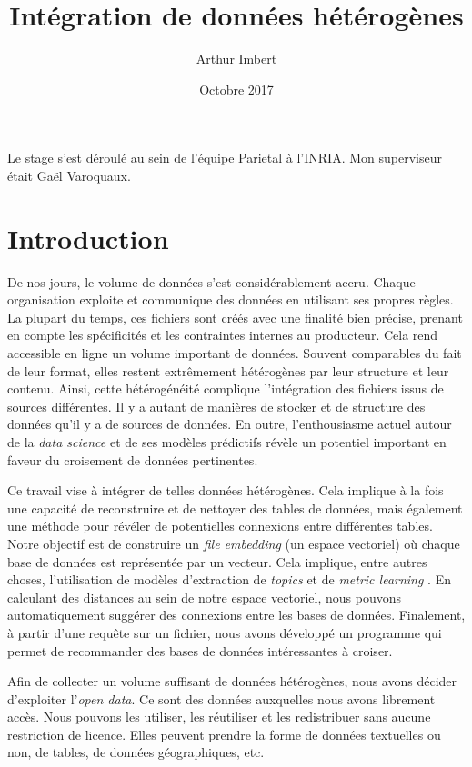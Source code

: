 \documentclass[a4paper]{article}
\author{Arthur Imbert}
\title{Intégration de données hétérogènes}
\date{Octobre 2017}
\begin{document}
	
	\maketitle
	
	Le stage s'est déroulé au sein de l'équipe \href{https://team.inria.fr/parietal/}{Parietal} à l'INRIA. Mon superviseur était Gaël Varoquaux.
	
	\section{Introduction}
	
	De nos jours, le volume de données s'est considérablement accru. Chaque organisation exploite et communique des données en utilisant ses propres règles. La plupart du temps, ces fichiers sont créés avec une finalité bien précise, prenant en compte les spécificités et les contraintes internes au producteur. Cela rend accessible en ligne un volume important de données. Souvent comparables du fait de leur format, elles restent extrêmement hétérogènes par leur structure et leur contenu. Ainsi, cette hétérogénéité complique l'intégration des fichiers issus de sources différentes. Il y a autant de manières de stocker et de structure des données qu'il y a de sources de données. En outre, l'enthousiasme actuel autour de la \emph{data science} et de ses modèles prédictifs révèle un potentiel important en faveur du croisement de données pertinentes. 
	
	Ce travail vise à intégrer de telles données hétérogènes. Cela implique à la fois une capacité de reconstruire et de nettoyer des tables de données, mais également une méthode pour révéler de potentielles connexions entre différentes tables. Notre objectif est de construire un \emph{file embedding} (un espace vectoriel) où chaque base de données est représentée par un vecteur. Cela implique, entre autres choses, l'utilisation de modèles d'extraction de \emph{topics} \cite{ref2} et de \emph{metric learning} \cite{ref3}. En calculant des distances au sein de notre espace vectoriel, nous pouvons automatiquement suggérer des connexions entre les bases de données. Finalement, à partir d'une requête sur un fichier, nous avons développé un programme qui permet de recommander des bases de données intéressantes à croiser.
	
	Afin de collecter un volume suffisant de données hétérogènes, nous avons décider d'exploiter l'\emph{open data}. Ce sont des données auxquelles nous avons librement accès. Nous pouvons les utiliser, les réutiliser et les redistribuer sans aucune restriction de licence. Elles peuvent prendre la forme de données textuelles ou non, de tables, de données géographiques, etc.
	
\end{document}

